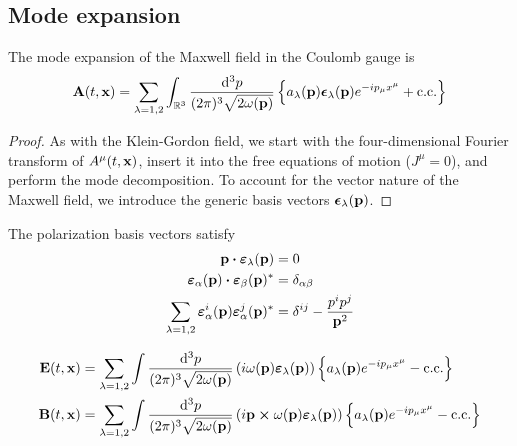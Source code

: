 \subsection{Mode expansion}

\begin{theorem}
	The mode expansion of the Maxwell field in the Coulomb gauge is
	\begin{equation}
		\vb{A}(t,\vb{x})
		=
		\sum_{\lambda=1,2}
		\int_{\mathbb{R}^3}\frac{\dd[3]{p}}{(2\pi)^3\sqrt{2\omega(\vb{p})}}
		\left\{
			a_\lambda(\vb{p})
			\boldsymbol{\epsilon}_\lambda(\vb{p})
			e^{-ip_\mu x^\mu}
			+
			\text{c.c.}
		\right\}
		\label{eq:mw_ft}
	\end{equation}
\end{theorem}
\begin{proof}
	As with the Klein-Gordon field, we start with the four-dimensional Fourier transform of $A^\mu(t,\vb{x})$, insert it into the free equations of motion ($J^\mu=0$), and perform the mode decomposition.
	To account for the vector nature of the Maxwell field, we introduce the generic basis vectors $\boldsymbol{\epsilon}_\lambda(\vb{p})$.
\end{proof}
\begin{theorem}
	The polarization basis vectors satisfy~\cite[p.~341]{Srednicki2007}
	\begin{align}
		\vb{p}
		\vdot
		\boldsymbol{\varepsilon}_\lambda(\vb{p})
		&=
		0
		\\
		\boldsymbol{\varepsilon}_\alpha(\vb{p})
		\vdot
		\boldsymbol{\varepsilon}_\beta(\vb{p})^*
		&=
		\delta_{\alpha\beta}
		\\
		\sum_{\lambda=1,2}
		\boldsymbol{\varepsilon}_\alpha^i(\vb{p})
		\boldsymbol{\varepsilon}_\alpha^j(\vb{p})^*
		&=
		\delta^{ij}
		-
		\frac{p^ip^j}{\vb{p}^2}
	\end{align}
\end{theorem}
\begin{theorem}
	\begin{align}
		\vb{E}(t,\vb{x})
		&=
		\sum_{\lambda=1,2}
		\int\frac{\dd[3]{p}}{(2\pi)^3\sqrt{2\omega(\vb{p})}}
		\left(
			i\omega(\vb{p})
			\boldsymbol{\varepsilon}_\lambda(\vb{p})
		\right)
		\left\{
			a_\lambda(\vb{p})
			e^{-ip_\mu x^\mu}
			-
			\text{c.c.}
		\right\}
		\\
		\vb{B}(t,\vb{x})
		&=
		\sum_{\lambda=1,2}
		\int\frac{\dd[3]{p}}{(2\pi)^3\sqrt{2\omega(\vb{p})}}
		\left(
			i\vb{p}\cross\omega(\vb{p})
			\boldsymbol{\varepsilon}_\lambda(\vb{p})
		\right)
		\left\{
			a_\lambda(\vb{p})
			e^{-ip_\mu x^\mu}
			-
			\text{c.c.}
		\right\}
	\end{align}
\end{theorem}
